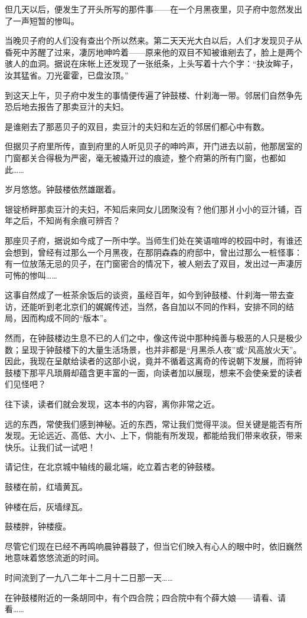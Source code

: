 \par 但几天以后，便发生了开头所写的那件事——在一个月黑夜里，贝子府中忽然发出了一声短暂的惨叫。
\par 当晚贝子府的人们没有查出个所以然来。第二天天光大白以后，人们才发现贝子从昏死中苏醒了过来，凄厉地呻吟着——原来他的双目不知被谁剜去了，脸上是两个骇人的血洞。据说在床帐上还发现了一张纸条，上头写着十六个字：“抉汝眸子，汝其猛省。刀光霍霍，已盘汝顶。”
\par 到这天上午，贝子府中发生的事情便传遍了钟鼓楼、什刹海一带。邻居们自然争先恐后地去报告了那卖豆汁的夫妇。
\par 是谁剜去了那恶贝子的双目，卖豆汁的夫妇和左近的邻居们都心中有数。
\par 但据贝子府里所传，直到府里的人听见贝子的呻吟声，开门进去以前，他那居室的门窗都关合得极为严密，毫无被撬开过的痕迹，整个府第的所有门窗，也都如此……
\par 岁月悠悠。钟鼓楼依然雄踞着。
\par 银锭桥畔那卖豆汁的夫妇，不知后来同女儿团聚没有？他们那爿小小的豆汁铺，百年之后，不知尚有余痕可辨否？
\par 那座贝子府，据说如今成了一所中学。当师生们处在笑语喧哗的校园中时，有谁还会想到，曾经有过那么一个月黑夜，在那阴森森的府邸中，曾出过那么一桩怪事：有一位放荡无忌的贝子，在门窗密合的情况下，被人剜去了双目，发出过一声凄厉可怖的惨叫……
\par 这事自然成了一桩茶余饭后的谈资，虽经百年，如今到钟鼓楼、什刹海一带去查访，还能听到老北京们的娓娓传述，当然，各自加以不同的作料，安排不同的结局，因而构成不同的“版本”。
\par 然而，在钟鼓楼边生息不已的人们之中，像这传说中那种纯善与极恶的人只是极少数；呈现于钟鼓楼下的大量生活场景，也并非都是“月黑杀人夜”或“风高放火天”。因此，我现在呈献给读者的这部小说，竟并不循着这离奇的传说朝下发展，而将钟鼓楼下那平凡琐屑却蕴含更丰富的一面，向读者加以展现，想来不会使亲爱的读者们见怪吧？
\par 往下读，读者们就会发现，这本书的内容，离你非常之近。
\par 远的东西，常使我们感到神秘。近的东西，常让我们觉得平淡。但关键是能否有所发现。无论远近、高低、大小、上下，倘能有所发现，都能给我们带来收获，带来快乐。让我们试一试吧！
\par 请记住，在北京城中轴线的最北端，屹立着古老的钟鼓楼。
\par 鼓楼在前，红墙黄瓦。
\par 钟楼在后，灰墙绿瓦。
\par 鼓楼胖，钟楼瘦。
\par 尽管它们现在已经不再鸣响晨钟暮鼓了，但当它们映入有心人的眼中时，依旧巍然地意味着悠悠流逝的时间。
\par 时间流到了一九八二年十二月十二日那一天……
\par 在钟鼓楼附近的一条胡同中，有个四合院；四合院中有个薛大娘——请看、请看……


